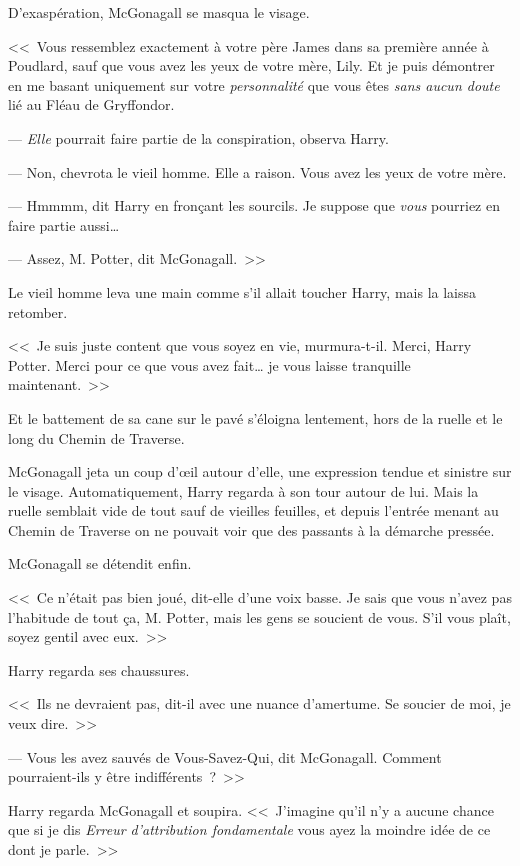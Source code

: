 D'exaspération, McGonagall se masqua le visage. 

<<~Vous ressemblez exactement à votre père James dans sa première année à Poudlard, sauf que vous avez les yeux de votre mère, Lily. Et je puis démontrer en me basant uniquement sur votre \emph{personnalité} que vous êtes \emph{sans aucun doute} lié au Fléau de Gryffondor.

--- \emph{Elle} pourrait faire partie de la conspiration, observa Harry.

--- Non, chevrota le vieil homme. Elle a raison. Vous avez les yeux de votre mère.

--- Hmmmm, dit Harry en fronçant les sourcils. Je suppose que \emph{vous} pourriez en faire partie aussi…

--- Assez, M. Potter, dit McGonagall.~>>

Le vieil homme leva une main comme s'il allait toucher Harry, mais la laissa retomber.

<<~Je suis juste content que vous soyez en vie, murmura-t-il. Merci, Harry Potter. Merci pour ce que vous avez fait… je vous laisse tranquille maintenant.~>>

Et le battement de sa cane sur le pavé s'éloigna lentement, hors de la ruelle et le long du Chemin de Traverse.

McGonagall jeta un coup d'œil autour d'elle, une expression tendue et sinistre sur le visage. Automatiquement, Harry regarda à son tour autour de lui. Mais la ruelle semblait vide de tout sauf de vieilles feuilles, et depuis l'entrée menant au Chemin de Traverse on ne pouvait voir que des passants à la démarche pressée.

McGonagall se détendit enfin.

<<~Ce n'était pas bien joué, dit-elle d'une voix basse. Je sais que vous n'avez pas l'habitude de tout ça, M. Potter, mais les gens se soucient de vous. S'il vous plaît, soyez gentil avec eux.~>>

Harry regarda ses chaussures.

<<~Ils ne devraient pas, dit-il avec une nuance d'amertume. Se soucier de moi, je veux dire.~>>

--- Vous les avez sauvés de Vous-Savez-Qui, dit McGonagall. Comment pourraient-ils y être indifférents~?~>>

Harry regarda McGonagall et soupira. <<~J'imagine qu'il n'y a aucune chance que si je dis \emph{Erreur d'attribution fondamentale} vous ayez la moindre idée de ce dont je parle.~>>

